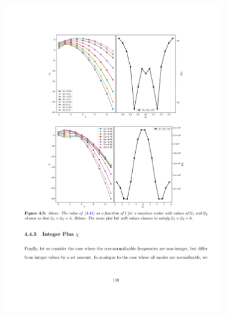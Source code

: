 \documentclass[mathserif,10pt]{beamer}
\begin{document}
{{\begin{columns}
\begin{figure}
{	\includegraphics[width=0.85\textwidth]{NNsum4m0}
	}
	\end{figure}
  \end{columns}
 }

}
\end{document}
